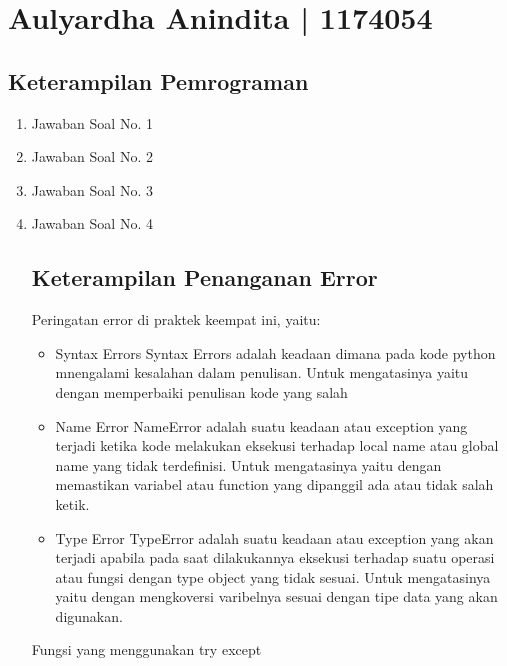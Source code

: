 
\section{Aulyardha Anindita | 1174054}
\subsection{Keterampilan Pemrograman}
\begin{enumerate}

\item Jawaban Soal No. 1


\item Jawaban Soal No. 2


\item Jawaban Soal No. 3


\item Jawaban Soal No. 4


\subsection{Keterampilan Penanganan Error}

Peringatan error di praktek keempat ini, yaitu:
\begin{itemize}
\item Syntax Errors
Syntax Errors adalah keadaan dimana pada kode python mnengalami kesalahan dalam penulisan. Untuk mengatasinya yaitu dengan memperbaiki penulisan kode yang salah 

\item Name Error
NameError adalah suatu keadaan atau exception yang terjadi ketika kode melakukan eksekusi terhadap local name atau global name yang tidak terdefinisi. Untuk mengatasinya yaitu dengan memastikan variabel atau function yang dipanggil ada atau tidak salah ketik.

\item Type Error
TypeError adalah suatu keadaan atau exception yang akan terjadi apabila pada saat dilakukannya eksekusi terhadap suatu operasi atau fungsi dengan type object yang tidak sesuai. Untuk mengatasinya yaitu dengan mengkoversi varibelnya sesuai dengan tipe data yang akan digunakan.
\end{itemize}

Fungsi yang menggunakan try except


\end{enumerate}

